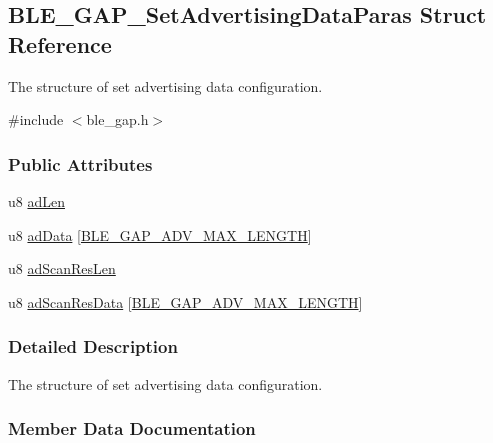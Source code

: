 \hypertarget{struct_b_l_e___g_a_p___set_advertising_data_paras}{}\subsection{B\+L\+E\+\_\+\+G\+A\+P\+\_\+\+Set\+Advertising\+Data\+Paras Struct Reference}
\label{struct_b_l_e___g_a_p___set_advertising_data_paras}


The structure of set advertising data configuration.  




{\ttfamily \#include $<$ble\+\_\+gap.\+h$>$}

\subsubsection*{Public Attributes}
\begin{DoxyCompactItemize}
\item 
u8 \hyperlink{struct_b_l_e___g_a_p___set_advertising_data_paras_a040c0d06e23821995759bcc71b4745d1}{ad\+Len}
\item 
u8 \hyperlink{struct_b_l_e___g_a_p___set_advertising_data_paras_ac1567c8c15abdfbc2d17f584a576b802}{ad\+Data} \mbox{[}\hyperlink{group___b_l_e___g_a_p___m_a_x___a_d_v___l_e_n_gaef184d7f23b1fa255e4ebfff7be16421}{B\+L\+E\+\_\+\+G\+A\+P\+\_\+\+A\+D\+V\+\_\+\+M\+A\+X\+\_\+\+L\+E\+N\+G\+TH}\mbox{]}
\item 
u8 \hyperlink{struct_b_l_e___g_a_p___set_advertising_data_paras_adb5f6ad2a2b6bb0003ade19598c05e3d}{ad\+Scan\+Res\+Len}
\item 
u8 \hyperlink{struct_b_l_e___g_a_p___set_advertising_data_paras_a11b236523b260aab91ba54b332faa8de}{ad\+Scan\+Res\+Data} \mbox{[}\hyperlink{group___b_l_e___g_a_p___m_a_x___a_d_v___l_e_n_gaef184d7f23b1fa255e4ebfff7be16421}{B\+L\+E\+\_\+\+G\+A\+P\+\_\+\+A\+D\+V\+\_\+\+M\+A\+X\+\_\+\+L\+E\+N\+G\+TH}\mbox{]}
\end{DoxyCompactItemize}


\subsubsection{Detailed Description}
The structure of set advertising data configuration. 

\subsubsection{Member Data Documentation}
